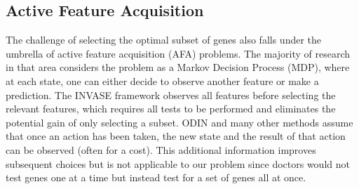 \subsection{Active Feature Acquisition}

The challenge of selecting the optimal subset of genes also falls under the umbrella of active feature acquisition (AFA) problems. The majority of research \cite{nam_reinforcement_2021, li_active_2021, fahy_dynamic_2019, yin_reinforcement_2020, shim_joint_2018} in that area considers the problem as a Markov Decision Process (MDP), where at each state, one can either decide to observe another feature or make a prediction. The INVASE framework \cite{yoon_invase_2018} observes all features before selecting the relevant features, which requires all tests to be performed and eliminates the potential gain of only selecting a subset. ODIN \cite{zannone_odin_2019} and many other methods \cite{yu_deep_2023, yin_reinforcement_2020, li_active_2021, nam_reinforcement_2021, shim_joint_2018} assume that once an action has been taken, the new state and the result of that action can be observed (often for a cost). This additional information improves subsequent choices but is not applicable to our problem since doctors would not test genes one at a time but instead test for a set of genes all at once.